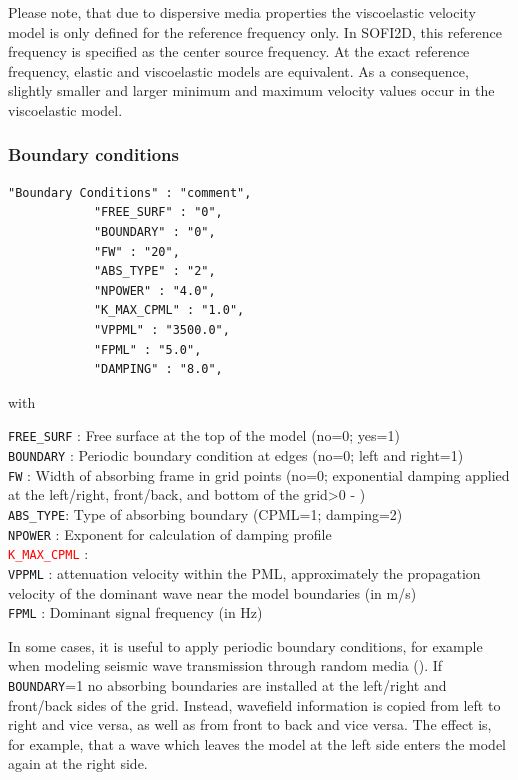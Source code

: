 Please note, that due to dispersive media properties the viscoelastic velocity model is only defined for the reference frequency only. In SOFI2D, this reference frequency is specified as the center source frequency. At the exact reference frequency, elastic and viscoelastic models are equivalent. As a consequence, slightly smaller and larger minimum and maximum velocity values occur in the viscoelastic model.

\subsubsection{Boundary conditions}
\label{abs}
\begin{verbatim}
"Boundary Conditions" : "comment",
            "FREE_SURF" : "0",
            "BOUNDARY" : "0",
            "FW" : "20",
            "ABS_TYPE" : "2",
            "NPOWER" : "4.0",
            "K_MAX_CPML" : "1.0",
            "VPPML" : "3500.0",
            "FPML" : "5.0",
            "DAMPING" : "8.0",
\end{verbatim}

with

\texttt{FREE\_SURF} : Free surface at the top of the model (no=0; yes=1)\\
\texttt{BOUNDARY} : Periodic boundary condition at edges (no=0; left and right=1)\\ 
\texttt{FW} : Width of absorbing frame in grid points (no=0; exponential damping applied at the left/right, front/back, and bottom of the grid>0 - \cite{cerjan:85})\\
\texttt{ABS\_TYPE}: Type of absorbing boundary (CPML=1; damping=2)\\
\texttt{NPOWER} : Exponent for calculation of damping profile \\
\texttt{\textcolor{red}{K\_MAX\_CPML}} : \\
\texttt{VPPML} : attenuation velocity within the PML, approximately the propagation velocity of the dominant wave near the model boundaries (in m/s)\\
\texttt{FPML} : Dominant signal frequency (in Hz)

In some cases, it is useful to apply periodic boundary conditions, for example when modeling seismic wave transmission through random media (\cite{bohlen:02}). If \texttt{BOUNDARY}=1 no absorbing boundaries are installed at the left/right and front/back sides of the grid. Instead, wavefield information is copied from left to right and vice versa, as well as from front to back and vice versa. The effect is, for example, that a wave which leaves the model at the left side enters the model again at the right side.

